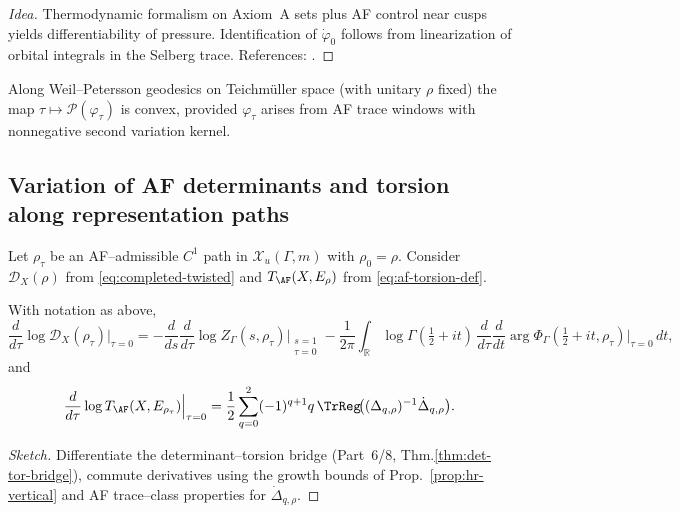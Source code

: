 \begin{proof}[Idea]
Thermodynamic formalism on Axiom~A sets plus AF control near cusps yields differentiability of pressure. Identification of $\dot{\varphi}_0$ follows from linearization of orbital integrals in the Selberg trace. References: \cite{Patterson,PPS,Borthwick}. %
\end{proof}

\begin{corollary}
\label{cor:pressure-convex}
Along Weil–Petersson geodesics on Teichm\"uller space (with unitary $\rho$ fixed) the map $\tau\mapsto \mathcal{P}(\varphi_\tau)$ is convex, provided $\varphi_\tau$ arises from AF trace windows with nonnegative second variation kernel. %
\end{corollary}

\subsection{Variation of AF determinants and torsion along representation paths}
\label{subsec:af-variation}
\relax\hspace{0pt}

Let $\rho_\tau$ be an AF–admissible $C^1$ path in $\mathcal{X}_u(\Gamma,m)$ with $\rho_0=\rho$. Consider $\mathscr{D}_X(\rho)$ from \eqref{eq:completed-twisted} and $T_{\AF}(X,E_\rho)$ from \eqref{eq:af-torsion-def}.

\begin{theorem}
\label{thm:hr-first-var}
With notation as above,
\[
\frac{d}{d\tau}\log \mathscr{D}_X(\rho_\tau)\Big|_{\tau=0}
= -\frac{d}{ds}\frac{d}{d\tau}\log Z_\Gamma(s,\rho_\tau)\Big|_{\substack{s=1\\ \tau=0}}
- \frac{1}{2\pi}\int_{\mathbb{R}}\!
\log\Gamma\!\left(\tfrac12+it\right)\, \frac{d}{d\tau}\frac{d}{dt}\arg\Phi_\Gamma\!\left(\tfrac12+it,\rho_\tau\right)\Big|_{\tau=0}\, dt,
\]
and
\[
\frac{d}{d\tau}\log T_{\AF}(X,E_{\rho_\tau})\Big|_{\tau=0}
= \frac12\sum_{q=0}^2(-1)^{q+1}q\,\TrReg\!\big((\Delta_{q,\rho})^{-1}\dot{\Delta}_{q,\rho}\big).
\]
\end{theorem}

\begin{proof}[Sketch]
Differentiate the determinant–torsion bridge (Part~6/8, Thm.\ref{thm:det-tor-bridge}), commute derivatives using the growth bounds of Prop.~\ref{prop:hr-vertical} and AF trace–class properties for $\dot{\Delta}_{q,\rho}$. %
\end{proof}

